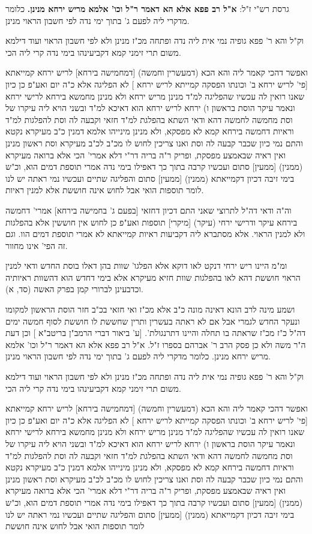 \documentclass[12pt, openany]{book}
\begin{document}
{{ גרסת רש"י ז"ל: \textbf{א"ל רב פפא אלא הא דאמר ר"ל וכו' אלמא מריש ירחא מנינן.} כלומר מדקרי ליה לפעם ג' בתוך ימי נדה לפי חשבון הראוי מנינן.\par וק"ל והא ר' פפא גופיה נמי אית ליה נדה ופתחה מכ"ז מנינן ולא לפי חשבון הראוי ועוד דילמא משום תרי זימני קמא דקביעינהו בימי נדה קרי ליה הכי.\par ואפשר דהכי קאמר ליה והא הכא (דמעשרין וחמשה) [דמחמישה בירחא] לריש ירחא קמייאתא [{\small פי' לריש ירחא ב' וכונתו הפסקה קמייתא לריש ירחא} ] לא הפליגה אלא כ"ה יום ואע"פ כן כיון שאנו רואין לה עכשיו שהפליגה למ"ד מנינן מריש ירחא ולא מנינן מחמשא בירחא לרישי ירחא ונאמר עיקר הוסת בראשון ו) ירחא לריש ירחא הוא דאיכא למ"ד ובשני הויא ליה עיקרו של וסת מחמשה לחמשה דהא ודאי השתא בהפלגת למ"ד חזאי וקבעה לה וסת להפלגות למ"ד וראיות דחמשה בירחא קמא לא מפסקא, ולא מנינן מינייהו אלמא דמנין כ"ב מעיקרא נקטא והתם נמי כיון שכבר קבעה לה וסת ואנו צריכין לחוש לו מכ"ב לכ"ב מעיקרא וסת ראשון מנינן ואין ראיה שבאמצע מפסקת, ופריק ר"ה בריה דר"י דלא אמרי' הכי אלא ברואה מעיקרא (ממנין) [ממעין] סתום ועכשיו קרבה בתוך כך דאפילו בימי נדה אמרי תוספת דמים הוא, וכ"ש בימי זיבה דכיון דקמייאתא (ממנין) [ממעין] סתום והפליגה שתיים ועכשיו נמי ראתה יש לנו לומר תוספות הואי אבל לחוש אינה חוששת אלא למנין ראיות.\par וה"ה ודאי דה"ל לתרוצי שאני התם דכיון דחזאי [בפעם ג' בחמישה בירחא] אמרי' דחמשה בירחא עיקר ודרישי ירחי (עיקר) [מיקרי] תוספות ואע"פ כן לחוש אין חוששין אלא בהפלגות ולא למנין הראוי. אלא מסתברא ליה דקביעות ראיות קמייאתא לא אמרי תוספת דמים הוו. וגם זה הפי' אינו מחוור.\par ומ"מ היינו ריש ירחי דנקט לאו דוקא אלא הפלגו' שוות בהן דאלו בוסת החדש ודאי למנין הראוי חוששת דהא לאו בהפלגות שוות חזיא מעיקרא אלא בימי דחדש הוא דהשוות ראיותיה וכדבעינן לברורי קמן בפרק האשה (סד, א).\par ושמע מינה לרב הונא דאינה מונה כ"ב אלא מכ"ז ואי חזאי בכ"ב חזר הוסת הראשון למקומו ונעקר החדש לגמרי אבל אם לא ראתה בעשרין ותרין שחששת לו חוששת לסוף חמשה ימים דה"ל כ"ז מכ"ז שראתה בו תחלה והיינו דתרנגולת'. [{\small ע' ביאור דברי הרמב"ן בריטב"א} ] וכן דעת ה"ר משה ולא כן פסק הרב ר' אברהם בספרו ז"ל. א"ל רב פפא אלא הא דאמר ר"ל וכו' אלמא מריש ירחא מנינן. כלומר מדקרי ליה לפעם ג' בתוך ימי נדה לפי חשבון הראוי מנינן.\par וק"ל והא ר' פפא גופיה נמי אית ליה נדה ופתחה מכ"ז מנינן ולא לפי חשבון הראוי ועוד דילמא משום תרי זימני קמא דקביעינהו בימי נדה קרי ליה הכי.\par ואפשר דהכי קאמר ליה והא הכא (דמעשרין וחמשה) [דמחמישה בירחא] לריש ירחא קמייאתא [{\small פי' לריש ירחא ב' וכונתו הפסקה קמייתא לריש ירחא} ] לא הפליגה אלא כ"ה יום ואע"פ כן כיון שאנו רואין לה עכשיו שהפליגה למ"ד מנינן מריש ירחא ולא מנינן מחמשא בירחא לרישי ירחא ונאמר עיקר הוסת בראשון ו) ירחא לריש ירחא הוא דאיכא למ"ד ובשני הויא ליה עיקרו של וסת מחמשה לחמשה דהא ודאי השתא בהפלגת למ"ד חזאי וקבעה לה וסת להפלגות למ"ד וראיות דחמשה בירחא קמא לא מפסקא, ולא מנינן מינייהו אלמא דמנין כ"ב מעיקרא נקטא והתם נמי כיון שכבר קבעה לה וסת ואנו צריכין לחוש לו מכ"ב לכ"ב מעיקרא וסת ראשון מנינן ואין ראיה שבאמצע מפסקת, ופריק ר"ה בריה דר"י דלא אמרי' הכי אלא ברואה מעיקרא (ממנין) [ממעין] סתום ועכשיו קרבה בתוך כך דאפילו בימי נדה אמרי תוספת דמים הוא, וכ"ש בימי זיבה דכיון דקמייאתא (ממנין) [ממעין] סתום והפליגה שתיים ועכשיו נמי ראתה יש לנו לומר תוספות הואי אבל לחוש אינה חוששת }}
\end{document}
